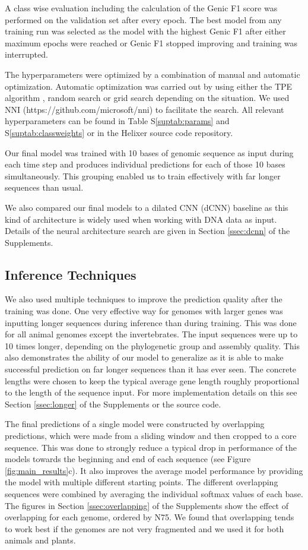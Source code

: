 \documentclass{bioinfo}
\newcounter{suptab}
\begin{document}
\begin{methods}
A class wise evaluation including the calculation of the Genic 
F1 score was performed on the validation set after every epoch. The best model
from any training run was selected as the model with the highest Genic F1 after either
maximum epochs were reached or Genic F1 stopped improving and training was interrupted.

The hyperparameters were optimized by a combination of manual and automatic 
optimization. Automatic optimization was carried out by using either the TPE 
algorithm \citep{bergstra2011algorithms}, random search or grid search depending on 
the situation. We used NNI (https://github.com/microsoft/nni) to 
facilitate the search. All relevant 
hyperparameters can be found in Table S\ref{suptab:params} and 
S\ref{suptab:classweights} or in the Helixer source code repository. 
	
Our final model was trained with 10 bases of genomic sequence as input during each 
time step and produces individual predictions for each of those 10 bases 
simultaneously. This grouping enabled us to train effectively with far longer 
sequences than usual. 

We also compared our final models to a dilated CNN (dCNN) 
baseline as this kind of architecture is 
widely used when working with DNA data as input. Details of the neural architecture 
search are given in Section \ref{ssec:dcnn} of the Supplements.

\subsection{Inference Techniques}
We also used multiple techniques to improve the prediction quality after the 
training was done. One very effective way for genomes with larger genes was inputting
longer sequences during inference than during training. This was done for all 
animal genomes except the invertebrates. The input sequences were up to 10 times 
longer, depending on the phylogenetic group and assembly quality. This also demonstrates the 
ability of our model to generalize as it is able to make successful prediction on 
far longer sequences than it has ever seen. The 
concrete lengths were chosen to keep the typical average gene length roughly 
proportional to the length of the sequence input. For more implementation details 
on this see Section \ref{ssec:longer} of the Supplements or the source code.
	
The final predictions of a single model were constructed by overlapping predictions, 
which were made from a sliding window and then cropped to a core sequence. This was done 
to strongly reduce a typical drop in performance of the models towards the beginning 
and end of each sequence (see Figure \ref{fig:main_results}c). It also improves the 
average model performance by providing the model with multiple different 
starting points. The different overlapping sequences were combined by averaging 
the individual softmax values of each base. 
The figures in Section \ref{ssec:overlapping} of the 
Supplements show the effect of overlapping for each genome, ordered by N75. We found 
that overlapping tends to work best if the genomes are not very fragmented and we 
used it for both animals and plants.


\end{methods}
\end{document}
